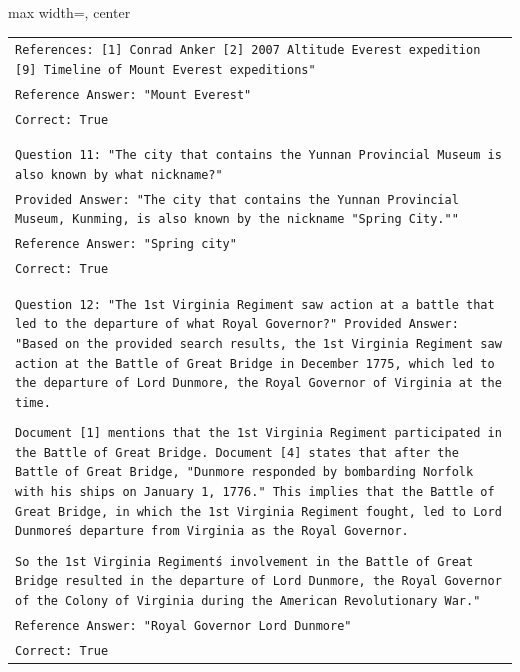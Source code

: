 \documentclass[11pt]{article}
\begin{document}
\begin{table}[ht]
\begin{adjustbox}{max width=\textwidth, center}
\begin{tabular}{>{\raggedright\arraybackslash\tt}p{}<{}}
References:
[1] Conrad Anker
[2] 2007 Altitude Everest expedition
[9] Timeline of Mount Everest expeditions"\\
Reference Answer: "Mount Everest"\\
Correct: True\\
\\
\\
Question 11: "The city that contains the Yunnan Provincial Museum is also known by what nickname?"\\
Provided Answer: "The city that contains the Yunnan Provincial Museum, Kunming, is also known by the nickname "Spring City.""\\
Reference Answer: "Spring city"\\
Correct: True\\
\\
\\
Question 12: "The 1st Virginia Regiment saw action at a battle that led to the departure of what Royal Governor?"
Provided Answer: "Based on the provided search results, the 1st Virginia Regiment saw action at the Battle of Great Bridge in December 1775, which led to the departure of Lord Dunmore, the Royal Governor of Virginia at the time.\\
\\
Document [1] mentions that the 1st Virginia Regiment participated in the Battle of Great Bridge. Document [4] states that after the Battle of Great Bridge, "Dunmore responded by bombarding Norfolk with his ships on January 1, 1776." This implies that the Battle of Great Bridge, in which the 1st Virginia Regiment fought, led to Lord Dunmore\'s departure from Virginia as the Royal Governor.\\
\\
So the 1st Virginia Regiment\'s involvement in the Battle of Great Bridge resulted in the departure of Lord Dunmore, the Royal Governor of the Colony of Virginia during the American Revolutionary War."\\
Reference Answer: "Royal Governor Lord Dunmore"\\
Correct: True\\



\end{tabular}
\end{adjustbox}
\end{table}
\end{document}
